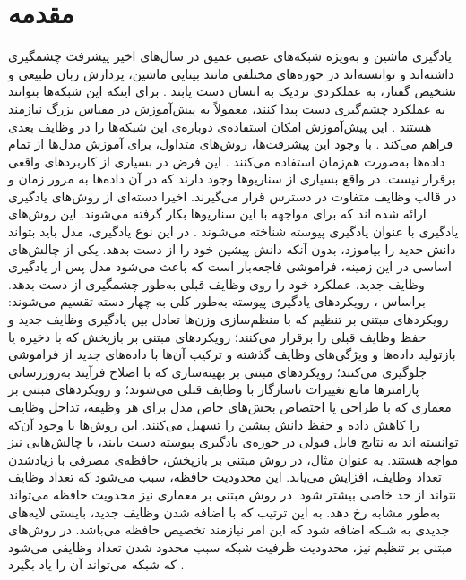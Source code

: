 \chapter{مقدمه}


یادگیری ماشین و به‌ویژه شبکه‌های عصبی عمیق در سال‌های اخیر پیشرفت چشمگیری داشته‌اند و توانسته‌اند در حوزه‌های مختلفی مانند بینایی ماشین، پردازش زبان طبیعی و تشخیص گفتار، به عملکردی نزدیک به انسان دست یابند \cite{attention_is_all_u_need-46,Mask-R-CNN-20,Deep-Residual-Learning-21,
	bert-10}. برای اینکه این شبکه‌ها بتوانند به عملکرد چشم‌گیری دست پیدا کنند، معمولاً به پیش‌آموزش در مقیاس بزرگ نیازمند هستند 
	\cite{attention_is_all_u_need-46,An-image-is-worth-11}. این پیش‌آموزش امکان استفاده‌ی دوباره‌‌ی این شبکه‌ها را در وظایف
	بعدی فراهم می‌کند 
	\cite{Multi-Task-Feature-Learning-4}.
با وجود این پیشرفت‌ها، روش‌های متداول، برای آموزش مدل‌ها از تمام داده‌ها به‌صورت هم‌زمان استفاده می‌کنند \cite{l2p}. این فرض در بسیاری از کاربردهای واقعی برقرار نیست. در واقع بسیاری از سناریوها وجود دارند که در آن داده‌ها به مرور زمان و در قالب وظایف متفاوت در دسترس قرار می‌گیرند. اخیرا دسته‌ای از روش‌های یادگیری ارائه شده اند که برای مواجهه با این سناریوها بکار گرفته می‌شوند. این روش‌های یادگیری با عنوان یادگیری پیوسته
 شناخته ‌می‌شوند \cite{1,2}. در این نوع یادگیری، مدل باید بتواند دانش جدید را بیاموزد، بدون آنکه دانش پیشین خود را از دست بدهد. یکی از چالش‌های اساسی در این زمینه، فراموشی فاجعه‌بار \cite{Catastrophic_forgetting} است که باعث می‌شود مدل پس از یادگیری وظایف جدید، عملکرد خود را روی وظایف قبلی به‌طور چشمگیری از دست بدهد. براساس \cite{1}، رویکردهای یادگیری پیوسته به‌طور کلی به چهار دسته تقسیم می‌شوند: رویکردهای مبتنی بر تنظیم که با منظم‌سازی وزن‌ها تعادل بین یادگیری وظایف جدید و حفظ وظایف قبلی را برقرار می‌کنند؛ رویکردهای مبتنی بر بازپخش که با ذخیره یا بازتولید داده‌ها و ویژگی‌های وظایف گذشته و ترکیب آن‌ها با داده‌های جدید از فراموشی جلوگیری می‌کنند؛ رویکردهای مبتنی بر بهینه‌سازی که با اصلاح فرآیند به‌روزرسانی پارامترها مانع تغییرات ناسازگار با وظایف قبلی می‌شوند؛ و رویکردهای مبتنی بر معماری که با طراحی یا اختصاص بخش‌های خاص مدل برای هر وظیفه، تداخل وظایف را کاهش داده و حفظ دانش پیشین را تسهیل می‌کنند. این روش‌ها با وجود آن‌که توانسته اند به نتایج قابل قبولی در حوزه‌ی یادگیری پیوسته دست یابند، با چالش‌هایی نیز مواجه هستند. به عنوان مثال، در روش مبتنی بر بازپخش، حافظه‌ی مصرفی با زیادشدن تعداد وظایف، افزایش می‌یابد. این محدودیت حافظه، سبب می‌شود که تعداد وظایف نتواند از حد خاصی بیشتر شود. در روش مبتنی بر معماری نیز محدویت حافظه می‌تواند به‌طور مشابه رخ دهد. به این ترتیب که با اضافه شدن وظایف جدید، بایستی لایه‌های جدیدی به شبکه اضافه شود که این امر نیازمند تخصیص حافظه می‌باشد. در روش‌های مبتنی بر تنظیم نیز، محدودیت ظرفیت شبکه سبب محدود شدن تعداد وظایفی می‌شود که شبکه می‌تواند آن را یاد بگیرد \cite{1,2}. 
 
